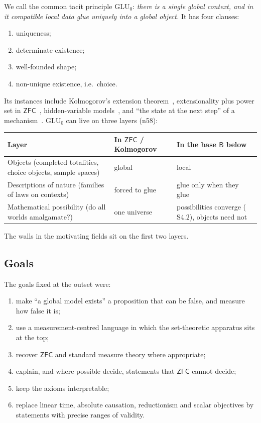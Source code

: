 \documentclass[11pt]{article}
\theoremstyle{definition}
\theoremstyle{remark}
\newcommand{\B}{\mathsf{B}}
\newcommand{\ZFC}{\mathsf{ZFC}}
\newcommand{\GLU}{\mathrm{GLU}}
\newcommand{\note}[1]{\textsf{(n#1)}}
\begin{document}
We call the common tacit principle $\GLU_0$: \emph{there is a single global context, and in it compatible local data glue uniquely into a global object.} It has four clauses:
\begin{enumerate}
\item uniqueness;
\item determinate existence;
\item well-founded shape;
\item non-unique existence, i.e.\ choice.
\end{enumerate}
Its instances include Kolmogorov's extension theorem~\cite{Kolmogorov33}, extensionality plus power set in $\ZFC$~\cite{Jech03}, hidden-variable models~\cite{Bell64}, and ``the state at the next step'' of a mechanism~\cite{Gandy80}. $\GLU_0$ can live on three layers \note{58}:

\begin{center}\small
\begin{tabular}{p{}p{}p{}}
\toprule
Layer & In $\ZFC$ / Kolmogorov & In the base $\B$ below\\
\midrule
Objects (completed totalities, choice objects, sample spaces) & global & local\\
Descriptions of nature (families of laws on contexts) & forced to glue & glue only when they glue\\
Mathematical possibility (do all worlds amalgamate?) & one universe & possibilities converge ($\mathrm{S4.2}$), objects need not\\
\bottomrule
\end{tabular}
\end{center}

\noindent The walls in the motivating fields sit on the first two layers.

\subsection{Goals}
The goals fixed at the outset were:
\begin{enumerate}[label=(R\arabic*)]
\item make ``a global model exists'' a proposition that can be false, and measure how false it is;
\item use a measurement-centred language in which the set-theoretic apparatus sits at the top;
\item recover $\ZFC$ and standard measure theory where appropriate;
\item explain, and where possible decide, statements that $\ZFC$ cannot decide;
\item keep the axioms interpretable;
\item replace linear time, absolute causation, reductionism and scalar objectives by statements with precise ranges of validity.
\end{enumerate}
\end{document}
